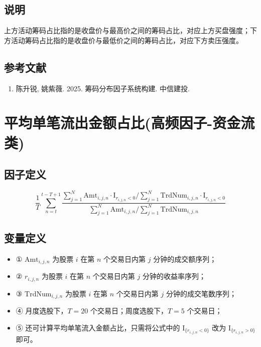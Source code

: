 \documentclass{article}
\begin{document}
\subsection{说明}
上方活动筹码占比指的是收盘价与最高价之间的筹码占比，对应上方买盘强度；下方活动筹码占比指的是收盘价与最低价之间的筹码占比，对应下方卖压强度。

\subsection{参考文献}
\begin{enumerate}
    \item 陈升锐, 姚紫薇. 2025. 筹码分布因子系统构建. 中信建投.
\end{enumerate}

\section{平均单笔流出金额占比(高频因子-资金流类)}

\subsection{因子定义}
\begin{equation}
    \frac{1}{T} \sum_{n=t}^{t-T+1} \frac{\sum_{j=1}^{N} \mathrm{Amt}_{i,j,n} \cdot \mathrm{I}_{r_{i,j,n} < 0} \Big/ \sum_{j=1}^{N} \mathrm{TrdNum}_{i,j,n} \cdot \mathrm{I}_{r_{i,j,n} < 0}}{\sum_{j=1}^{N} \mathrm{Amt}_{i,j,n} \Big/ \sum_{j=1}^{N} \mathrm{TrdNum}_{i,j,n}}
\end{equation}

\subsection{变量定义}
\begin{itemize}
    \item ① \( \mathrm{Amt}_{i,j,n} \) 为股票 \( i \) 在第 \( n \) 个交易日内第 \( j \) 分钟的成交额序列；
    \item ② \( r_{i,j,n} \) 为股票 \( i \) 在第 \( n \) 个交易日内第 \( j \) 分钟的收益率序列；
    \item ③ \( \mathrm{TrdNum}_{i,j,n} \) 为股票 \( i \) 在第 \( n \) 个交易日内第 \( j \) 分钟的成交笔数序列；
    \item ④ 月度选股下，\( T = 20 \) 个交易日；周度选股下，\( T = 5 \) 个交易日；
    \item ⑤ 还可计算平均单笔流入金额占比，只需将公式中的 \( \mathrm{I}_{\{r_{i,j,n} < 0\}} \) 改为 \( \mathrm{I}_{\{r_{i,j,n} > 0\}} \) 即可。
\end{itemize}
\end{document}

